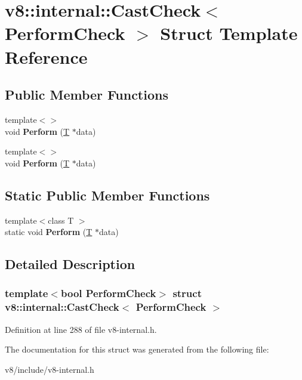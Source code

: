 \hypertarget{structv8_1_1internal_1_1CastCheck}{}\section{v8\+:\+:internal\+:\+:Cast\+Check$<$ Perform\+Check $>$ Struct Template Reference}
\label{structv8_1_1internal_1_1CastCheck}
\subsection*{Public Member Functions}
\begin{DoxyCompactItemize}
\item 
\mbox{\label{structv8_1_1internal_1_1CastCheck_a0a213344d48ca226529f7ebd6edd6f3e}} 
{\footnotesize template$<$$>$ }\\void {\bfseries Perform} (\mbox{\hyperlink{classv8_1_1internal_1_1torque_1_1T}{T}} $\ast$data)
\item 
\mbox{\label{structv8_1_1internal_1_1CastCheck_ab169a4db19476037fa7f64bb2f5b1ccf}} 
{\footnotesize template$<$$>$ }\\void {\bfseries Perform} (\mbox{\hyperlink{classv8_1_1internal_1_1torque_1_1T}{T}} $\ast$data)
\end{DoxyCompactItemize}
\subsection*{Static Public Member Functions}
\begin{DoxyCompactItemize}
\item 
\mbox{\label{structv8_1_1internal_1_1CastCheck_a79edb0718f67826a1c2c1eba5a5a9bf5}} 
{\footnotesize template$<$class T $>$ }\\static void {\bfseries Perform} (\mbox{\hyperlink{classv8_1_1internal_1_1torque_1_1T}{T}} $\ast$data)
\end{DoxyCompactItemize}


\subsection{Detailed Description}
\subsubsection*{template$<$bool Perform\+Check$>$\newline
struct v8\+::internal\+::\+Cast\+Check$<$ Perform\+Check $>$}



Definition at line 288 of file v8-\/internal.\+h.



The documentation for this struct was generated from the following file\+:\begin{DoxyCompactItemize}
\item 
v8/include/v8-\/internal.\+h\end{DoxyCompactItemize}
